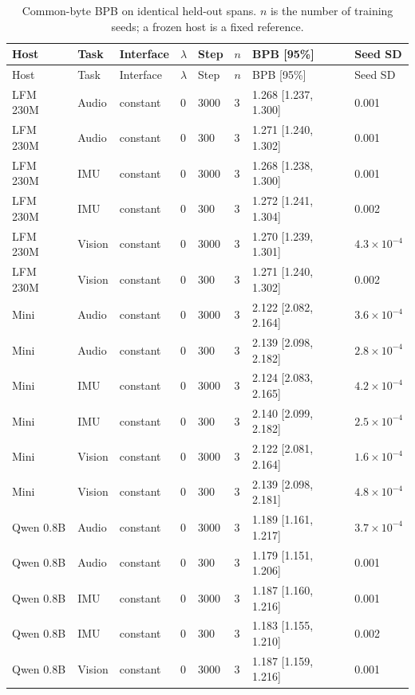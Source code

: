 {\small
\setlength{\tabcolsep}{4pt}
\begin{longtable}{@{}llllllll@{}}
\caption{Common-byte BPB on identical held-out spans. $n$ is the number of training seeds; a frozen host is a fixed reference.}\label{tab:full-common_bpb}\\
\toprule
Host & Task & Interface & $\lambda$ & Step & $n$ & BPB [95\%] & Seed SD \\
\midrule\endfirsthead
\toprule
Host & Task & Interface & $\lambda$ & Step & $n$ & BPB [95\%] & Seed SD \\
\midrule\endhead
LFM 230M & Audio & constant & 0 & 3000 & 3 & 1.268 [1.237, 1.300] & 0.001 \\
LFM 230M & Audio & constant & 0 & 300 & 3 & 1.271 [1.240, 1.302] & 0.001 \\
LFM 230M & IMU & constant & 0 & 3000 & 3 & 1.268 [1.238, 1.300] & 0.001 \\
LFM 230M & IMU & constant & 0 & 300 & 3 & 1.272 [1.241, 1.304] & 0.002 \\
LFM 230M & Vision & constant & 0 & 3000 & 3 & 1.270 [1.239, 1.301] & $4.3\times10^{-4}$ \\
LFM 230M & Vision & constant & 0 & 300 & 3 & 1.271 [1.240, 1.302] & 0.002 \\
Mini & Audio & constant & 0 & 3000 & 3 & 2.122 [2.082, 2.164] & $3.6\times10^{-4}$ \\
Mini & Audio & constant & 0 & 300 & 3 & 2.139 [2.098, 2.182] & $2.8\times10^{-4}$ \\
Mini & IMU & constant & 0 & 3000 & 3 & 2.124 [2.083, 2.165] & $4.2\times10^{-4}$ \\
Mini & IMU & constant & 0 & 300 & 3 & 2.140 [2.099, 2.182] & $2.5\times10^{-4}$ \\
Mini & Vision & constant & 0 & 3000 & 3 & 2.122 [2.081, 2.164] & $1.6\times10^{-4}$ \\
Mini & Vision & constant & 0 & 300 & 3 & 2.139 [2.098, 2.181] & $4.8\times10^{-4}$ \\
Qwen 0.8B & Audio & constant & 0 & 3000 & 3 & 1.189 [1.161, 1.217] & $3.7\times10^{-4}$ \\
Qwen 0.8B & Audio & constant & 0 & 300 & 3 & 1.179 [1.151, 1.206] & 0.001 \\
Qwen 0.8B & IMU & constant & 0 & 3000 & 3 & 1.187 [1.160, 1.216] & 0.001 \\
Qwen 0.8B & IMU & constant & 0 & 300 & 3 & 1.183 [1.155, 1.210] & 0.002 \\
Qwen 0.8B & Vision & constant & 0 & 3000 & 3 & 1.187 [1.159, 1.216] & 0.001 \\

\end{longtable}}
